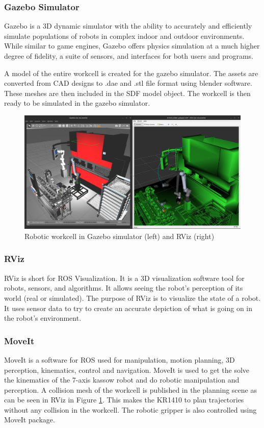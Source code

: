 \subsubsection{Gazebo Simulator}
\label{subsubsec:gazebo}
Gazebo is a 3D dynamic simulator with the ability to accurately and efficiently simulate populations
of robots in complex indoor and outdoor environments. While similar to game engines, Gazebo
offers physics simulation at a much higher degree of fidelity, a suite of sensors, and interfaces for
both users and programs. \cite{gazebo-classic}

A model of the entire workcell is created for the gazebo simulator. The assets are converted from CAD designs
to .dae and .stl file format using blender software. These meshes are then included in the SDF model object.
The workcell is then ready to be simulated in the gazebo simulator.

\begin{figure}[h]
    \centering
    \includegraphics[width=\textwidth]{figures/gazebo-rviz.png}
    \caption{Robotic workcell in Gazebo simulator (left) and RViz (right)}
    \label{fig:gazebo-rviz}
\end{figure}

\subsubsection{RViz}
\label{subsubsec:RViz}
RViz is short for ROS Visualization. It is a 3D visualization software tool for robots, sensors, and algorithms.
It allows seeing the robot's perception of its world (real or simulated).
The purpose of RViz is to visualize the state of a robot. It uses sensor data to try
to create an accurate depiction of what is going on in the robot's environment. \cite{rviz}

\subsubsection{MoveIt}
\label{subsubsec:moveit}
MoveIt is a software for ROS used for manipulation, motion planning, 3D perception, kinematics, control and navigation. \cite{moveit}
MoveIt is used to get the solve the kinematics of the 7-axis kassow robot and do robotic manipulation and perception.
A collision mesh of the workcell is published in the planning scene as can be seen in RViz in Figure \ref{fig:gazebo-rviz}.
This makes the KR1410 to plan trajectories without any collision in the workcell. The robotic gripper is also controlled using MoveIt package.
